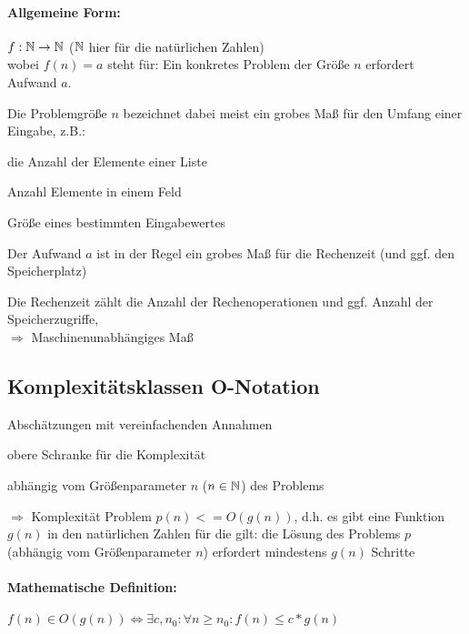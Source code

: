 \paragraph{Allgemeine Form:} $f : \mathbb{N} \to \mathbb{N}$ ($\mathbb{N}$ hier für die natürlichen Zahlen)\\
wobei $f(n) = a$ steht für: {\flqq Ein konkretes Problem der Größe $n$ erfordert Aufwand $a$.\frqq}
\begin{compactitem}
	\item Die {\flqq Problemgröße\frqq} $n$ bezeichnet dabei meist ein grobes Maß für den Umfang einer Eingabe, z.B.:
	\begin{compactitem}
		\item die Anzahl der Elemente einer Liste
		\item Anzahl Elemente in einem Feld
		\item Größe eines bestimmten Eingabewertes
	\end{compactitem}
	\item Der {\flqq Aufwand\frqq} $a$ ist in der Regel ein grobes Maß für die Rechenzeit (und ggf. den Speicherplatz)
	\item Die Rechenzeit zählt die Anzahl der Rechenoperationen und ggf. Anzahl der Speicherzugriffe,\\
	$\Rightarrow$ Maschinenunabhängiges Maß
\end{compactitem}

\subsection{Komplexitätsklassen {\flqq O-Notation\frqq}}
\begin{compactitem}
	\item Abschätzungen mit vereinfachenden Annahmen
	\item obere Schranke für die Komplexität
	\item abhängig vom Größenparameter $n$ ($n\in\mathbb{N}$) des Problems
\end{compactitem}
$\Rightarrow$ Komplexität Problem $p(n) <= O(g(n))$, d.h. es gibt eine Funktion $g(n)$ in den natürlichen Zahlen für die gilt: die Lösung des Problems $p$ (abhängig vom Größenparameter $n$) erfordert mindestens $g(n)$ Schritte

\paragraph{Mathematische Definition:} $f(n) \in O(g(n)) \Leftrightarrow \exists c, n_0 : \forall n \ge n_0 : f(n) \le c * g(n)$

